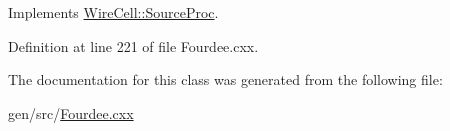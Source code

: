 Implements \hyperlink{class_wire_cell_1_1_source_proc_a480b8ba5e80e9e7c6ffdf0b5d9fd0578}{Wire\+Cell\+::\+Source\+Proc}.



Definition at line 221 of file Fourdee.\+cxx.



The documentation for this class was generated from the following file\+:\begin{DoxyCompactItemize}
\item 
gen/src/\hyperlink{_fourdee_8cxx}{Fourdee.\+cxx}\end{DoxyCompactItemize}

